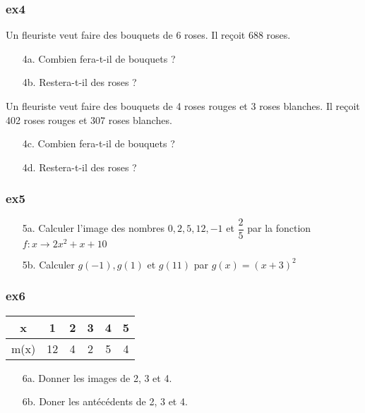 \documentclass[11pt]{article}
\begin{document}
\begin{multicols}{2}
\subsubsection*{ex4}

Un fleuriste veut faire des bouquets de 6 roses. Il reçoit 688 roses.
\begin{enumerate}
  \item[4a.]  Combien fera-t-il de bouquets ?
  \item[4b.] Restera-t-il des roses ?
\end{enumerate}

Un fleuriste veut faire des bouquets de 4 roses rouges et 3 roses blanches. Il reçoit 402 roses rouges et 307 roses blanches.
\begin{enumerate}
  \item[4c.]  Combien fera-t-il de bouquets ?
  \item[4d.] Restera-t-il des roses ?
\end{enumerate}

\subsubsection*{ex5}

\begin{enumerate}
  \item[5a.]  Calculer l'image des nombres $0, 2, 5, 12, -1$ et $\dfrac{2}{5}$ par la fonction $f : x \rightarrow 2 x^2 + x + 10$
  \item[5b.] Calculer $g(-1), g(1)$ et $g(11)$ par $g(x) = (x+3)^2$
\end{enumerate}

\subsubsection*{ex6}

\begin{center}
  \begin{tabular}{|c||c|c|c|c|c|}
  \hline
    x  & 1 & 2 & 3 & 4 & 5 \\
  \hline
  m(x) & 12 & 4 & 2 & 5 & 4 \\
  \hline
\end{tabular}
\end{center}

\begin{enumerate}
  \item[6a.] Donner les images de 2, 3 et 4.
  \item[6b.] Doner les antécédents de 2, 3 et 4.
\end{enumerate}

\end{multicols}
\end{document}
